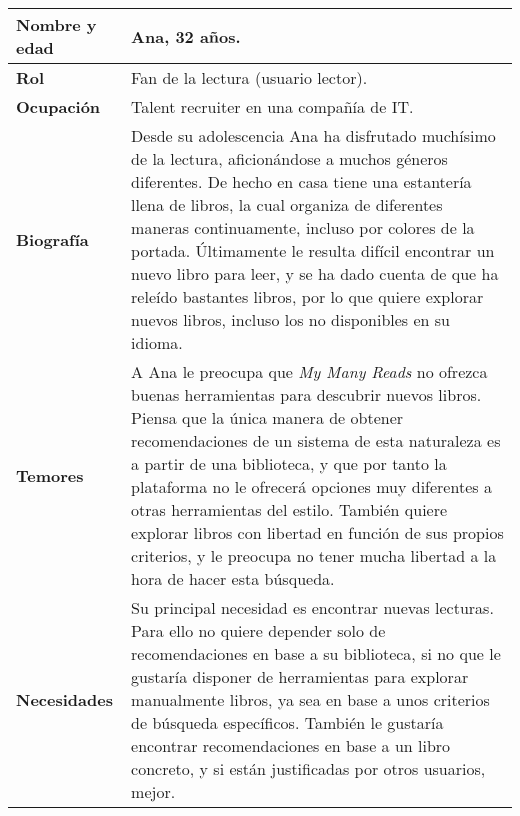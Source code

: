 \begin{table}[H]
    \centering
    \begin{tabularx}{\columnwidth}{|l|X|}
        \hline
        \textbf{Nombre y edad} & Ana, 32 años. \\
        \hline
        \textbf{Rol} & Fan de la lectura (usuario lector). \\
        \hline
        \textbf{Ocupación} & Talent recruiter en una compañía de IT. \\
        \hline
        \textbf{Biografía} & Desde su adolescencia Ana ha disfrutado muchísimo de la lectura, aficionándose a muchos géneros diferentes. De hecho en casa tiene una estantería llena de libros, la cual organiza de diferentes maneras continuamente, incluso por colores de la portada. Últimamente le resulta difícil encontrar un nuevo libro para leer, y se ha dado cuenta de que ha releído bastantes libros, por lo que quiere explorar nuevos libros, incluso los no disponibles en su idioma. \\
        \hline
        \textbf{Temores} & A Ana le preocupa que \textit{My Many Reads} no ofrezca buenas herramientas para descubrir nuevos libros. Piensa que la única manera de obtener recomendaciones de un sistema de esta naturaleza es a partir de una biblioteca, y que por tanto la plataforma no le ofrecerá opciones muy diferentes a otras herramientas del estilo. También quiere explorar libros con libertad en función de sus propios criterios, y le preocupa no tener mucha libertad a la hora de hacer esta búsqueda. \\
        \hline
        \textbf{Necesidades} & Su principal necesidad es encontrar nuevas lecturas. Para ello no quiere depender solo de recomendaciones en base a su biblioteca, si no que le gustaría disponer de herramientas para explorar manualmente libros, ya sea en base a unos criterios de búsqueda específicos. También le gustaría encontrar recomendaciones en base a un libro concreto, y si están justificadas por otros usuarios, mejor. \\
        \hline
    \end{tabularx}
\end{table}

